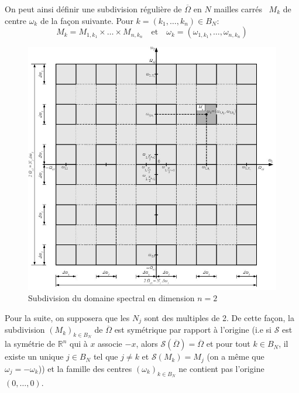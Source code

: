 On peut ainsi définir une subdivision régulière de $\overline{\Omega}$ en $N$ mailles \mbox{\og carrés \fg} $M_k$ de centre $\omega_k$ de la façon suivante. 
Pour $k = (k_1, \dots, k_n) \in B_N$:
\begin{equation}
M_k = M_{1,k_1} \times \dots \times M_{n,k_n} 
\quad \text{et} \quad \omega_k = (\omega_{1,k_1}, \dots, \omega_{n,k_n}) \label{mailles}
\end{equation}


\begin{figure}[h]
\begin{center}
\includegraphics[scale=0.9]{images/grilleSpectraleDim2.jpg}
\caption{Subdivision du domaine spectral en dimension $n=2$}
\label{subdivSpecDim2}  
\end{center}
\end{figure}

\newpage
\begin{hypothesis}
  \label{symetrie} 
  Pour la suite, on supposera que les $N_j$ sont des multiples de 2. De cette façon, la subdivision $(M_k)_{k \in B_N}$ de $\overline{\Omega}$  est symétrique par rapport à l'origine (i.e si $\mathcal{S}$ est la symétrie de $\mathbb{R}^n$ qui à $x$ associe $-x$, alors $\mathcal{S}(\overline{\Omega}) = \overline{\Omega}$ et pour tout $k \in B_N$, il existe un unique $j \in B_N$ tel que $j \neq k$ et $\mathcal{S}(M_k) = M_j$ (on a même que $\omega_j = -\omega_k$)) et la famille des centres $(\omega_k)_{k \in B_N}$ ne contient pas l'origine $(0, \dots, 0)$. 
\end{hypothesis}




